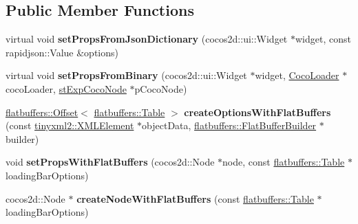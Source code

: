 \subsection*{Public Member Functions}
\begin{DoxyCompactItemize}
\item 
\mbox{\label{classcocostudio_1_1LoadingBarReader_ab5909d35968dfaf4c5348d6fe23d58f0}} 
virtual void {\bfseries set\+Props\+From\+Json\+Dictionary} (cocos2d\+::ui\+::\+Widget $\ast$widget, const rapidjson\+::\+Value \&options)
\item 
\mbox{\label{classcocostudio_1_1LoadingBarReader_a7ae46a517929ab7567445c3bd8993347}} 
virtual void {\bfseries set\+Props\+From\+Binary} (cocos2d\+::ui\+::\+Widget $\ast$widget, \hyperlink{classcocostudio_1_1CocoLoader}{Coco\+Loader} $\ast$coco\+Loader, \hyperlink{structcocostudio_1_1stExpCocoNode}{st\+Exp\+Coco\+Node} $\ast$p\+Coco\+Node)
\item 
\mbox{\label{classcocostudio_1_1LoadingBarReader_a00fae8ae25d8cbc7733a743114e57b1f}} 
\hyperlink{structflatbuffers_1_1Offset}{flatbuffers\+::\+Offset}$<$ \hyperlink{classflatbuffers_1_1Table}{flatbuffers\+::\+Table} $>$ {\bfseries create\+Options\+With\+Flat\+Buffers} (const \hyperlink{classtinyxml2_1_1XMLElement}{tinyxml2\+::\+X\+M\+L\+Element} $\ast$object\+Data, \hyperlink{classflatbuffers_1_1FlatBufferBuilder}{flatbuffers\+::\+Flat\+Buffer\+Builder} $\ast$builder)
\item 
\mbox{\label{classcocostudio_1_1LoadingBarReader_aad065dc19cae6485a9411be6a3f972b6}} 
void {\bfseries set\+Props\+With\+Flat\+Buffers} (cocos2d\+::\+Node $\ast$node, const \hyperlink{classflatbuffers_1_1Table}{flatbuffers\+::\+Table} $\ast$loading\+Bar\+Options)
\item 
\mbox{\label{classcocostudio_1_1LoadingBarReader_a369cf04fd68194890440bcf85cbdae8f}} 
cocos2d\+::\+Node $\ast$ {\bfseries create\+Node\+With\+Flat\+Buffers} (const \hyperlink{classflatbuffers_1_1Table}{flatbuffers\+::\+Table} $\ast$loading\+Bar\+Options)
\item 
\mbox{\label{classcocostudio_1_1LoadingBarReader_a9600a53194e2544618d982445cd15199}} 

\end{DoxyCompactItemize}
